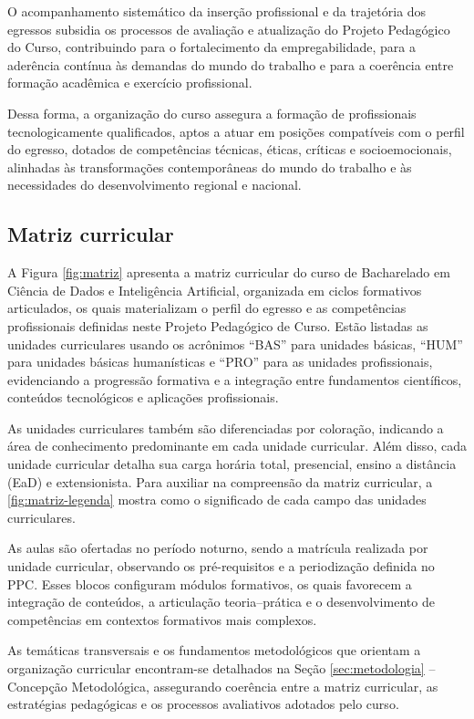 O acompanhamento sistemático da inserção profissional e da trajetória dos egressos subsidia os processos de avaliação e atualização do Projeto Pedagógico do Curso, contribuindo para o fortalecimento da empregabilidade, para a aderência contínua às demandas do mundo do trabalho e para a coerência entre formação acadêmica e exercício profissional.

Dessa forma, a organização do curso assegura a formação de profissionais tecnologicamente qualificados, aptos a atuar em posições compatíveis com o perfil do egresso, dotados de competências técnicas, éticas, críticas e socioemocionais, alinhadas às transformações contemporâneas do mundo do trabalho e às necessidades do desenvolvimento regional e nacional.

\subsection{Matriz curricular}

A Figura \ref{fig:matriz} apresenta a matriz curricular do curso de Bacharelado em Ciência de Dados e Inteligência Artificial, organizada em ciclos formativos articulados, os quais materializam o perfil do egresso e as competências profissionais definidas neste Projeto Pedagógico de Curso. Estão listadas as unidades curriculares usando os acrônimos “BAS” para unidades básicas, “HUM” para unidades básicas humanísticas e “PRO” para as unidades profissionais, evidenciando a progressão formativa e a integração entre fundamentos científicos, conteúdos tecnológicos e aplicações profissionais.

As unidades curriculares também são diferenciadas por coloração, indicando a área de conhecimento predominante em cada unidade curricular. Além disso, cada unidade curricular detalha sua carga horária total, presencial, ensino a distância (EaD) e extensionista. Para auxiliar na compreensão da matriz curricular, a \ref{fig:matriz-legenda} mostra como o significado de cada campo das unidades curriculares.

As aulas são ofertadas no período noturno, sendo a matrícula realizada por unidade curricular, observando os pré-requisitos e a periodização definida no PPC. Esses blocos configuram módulos formativos, os quais favorecem a integração de conteúdos, a articulação teoria–prática e o desenvolvimento de competências em contextos formativos mais complexos.

As temáticas transversais e os fundamentos metodológicos que orientam a organização curricular encontram-se detalhados na Seção \ref{sec:metodologia} – Concepção Metodológica, assegurando coerência entre a matriz curricular, as estratégias pedagógicas e os processos avaliativos adotados pelo curso.

